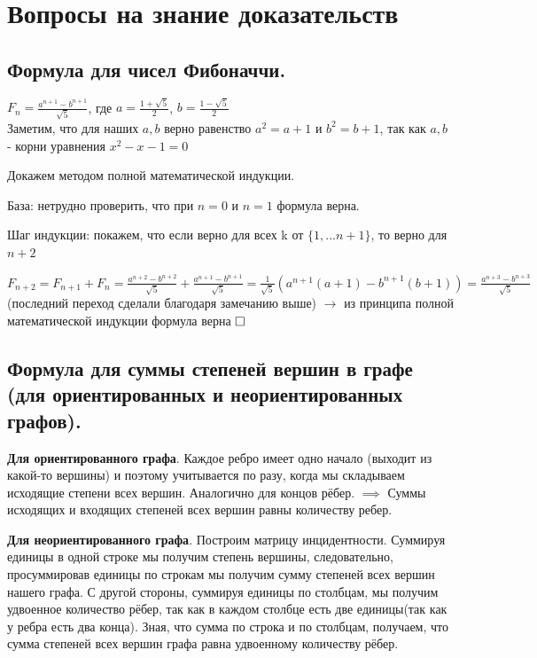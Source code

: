 \documentclass[a4paper, 10pt]{article}
\begin{document}
\section{Вопросы на знание доказательств}


\subsection{Формула для чисел Фибоначчи.}

$F_n = \frac{a^{n + 1} - b^{n + 1}}{\sqrt{5}}$, где $a = \frac{1 + \sqrt{5}}{2}$, $b = \frac{1 - \sqrt{5}}{2}$ \\

Заметим, что для наших $a, b$ верно равенство $a^2 = a + 1$ и $b^2 = b + 1$, так как $a, b$ -  корни уравнения $x^2 - x -  1 = 0$


Докажем методом полной математической индукции. 

База: нетрудно проверить, что при $n = 0$ и $n = 1$ формула верна.


Шаг индукции: покажем, что если верно для всех k от $\{1, ... n + 1 \}$, то верно для $n + 2$ 


$\displaystyle F_{n + 2} = F_{n + 1} + F_n = \frac{a^{n + 2} - b^{n + 2}}{\sqrt{5}} + \frac{a^{n + 1} - b^{n + 1}}{\sqrt{5}} = \frac{1}{\sqrt{5}}(a^{n + 1}(a + 1) - b^{n + 1}(b + 1)) = \frac{a^{n + 3} - b^{n + 3}}{\sqrt{5}}$(последний переход сделали благодаря замечанию выше) $\to$ из принципа полной математической индукции формула верна $\hfill \square$



\subsection{Формула для суммы степеней вершин в графе (для ориентированных и неориентированных графов).}

\textbf{Для ориентированного графа}. Каждое ребро имеет одно начало (выходит из какой-то вершины) и поэтому учитывается по разу, когда мы складываем исходящие степени всех вершин. Аналогично для концов рёбер. $\implies$ Суммы исходящих и входящих степеней всех вершин равны количеству ребер.

\textbf{Для неориентированного графа}. Построим матрицу инцидентности. Суммируя единицы в одной строке мы получим степень вершины, следовательно, просуммировав единицы по строкам мы получим сумму степеней всех вершин нашего графа. С другой стороны, суммируя единицы по столбцам, мы получим удвоенное количество рёбер, так как в каждом столбце есть две единицы(так как у ребра есть два конца). Зная, что сумма по строка и по столбцам, получаем, что сумма степеней всех вершин графа равна удвоенному количеству рёбер.
\end{document}
